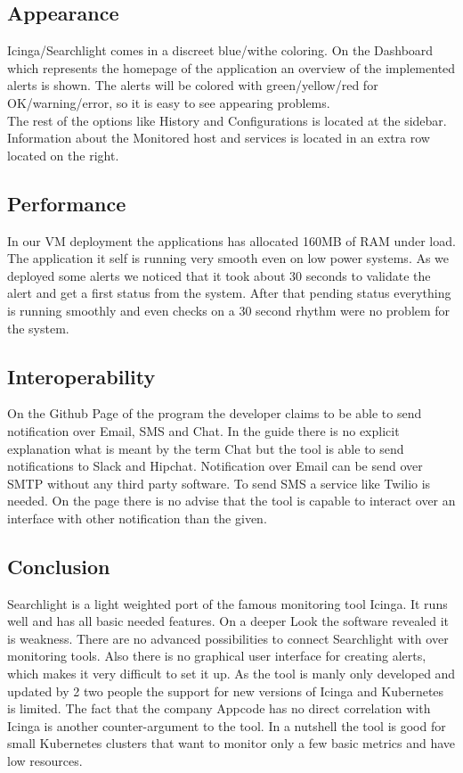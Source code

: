 \subsection{Appearance}
Icinga/Searchlight comes in a  discreet blue/withe coloring. On the Dashboard which represents the homepage of the application an overview of the implemented alerts is shown. The alerts will be colored with green/yellow/red for OK/warning/error, so it is easy to see appearing problems.\\
 The rest of the options like History and Configurations is located at the sidebar. Information about the Monitored host and services is located in an extra row located on the right.
\subsection{Performance}
In our VM deployment the applications has allocated 160MB of RAM under load. The application it self is running very smooth even on low power systems. As we deployed some alerts we noticed that it took about 30 seconds to validate the alert and get a first status from the system. After that pending status everything is running smoothly and even checks on a 30 second rhythm were no problem for the system.
\subsection{Interoperability}
On the Github Page \cite{searchlight} of the program the developer claims to be able to send notification over Email, SMS and Chat.
In the guide there is no explicit explanation what is meant by the term Chat but the tool is able to send notifications to Slack \cite{slack} and Hipchat. Notification over Email can be send over SMTP without any third party software. To send SMS a service like Twilio \cite{twilio} is needed.
On the page there is no advise that the tool is capable to interact over an interface with other notification than the given. 
\subsection{Conclusion}
Searchlight is a light weighted  port of the famous monitoring tool Icinga. It runs well and has all basic needed features. On a deeper Look the software revealed it is weakness. There are no advanced possibilities to connect Searchlight with over monitoring tools. Also there is no graphical user interface for creating alerts, which makes it very difficult to set it up. As the tool is manly only developed and updated by 2 two people the support for new versions of Icinga and Kubernetes is limited. The fact that the company Appcode has no direct correlation with Icinga is another counter-argument to the tool. In a nutshell the tool is good for small Kubernetes clusters that want to monitor only a few basic metrics and have low resources. 


